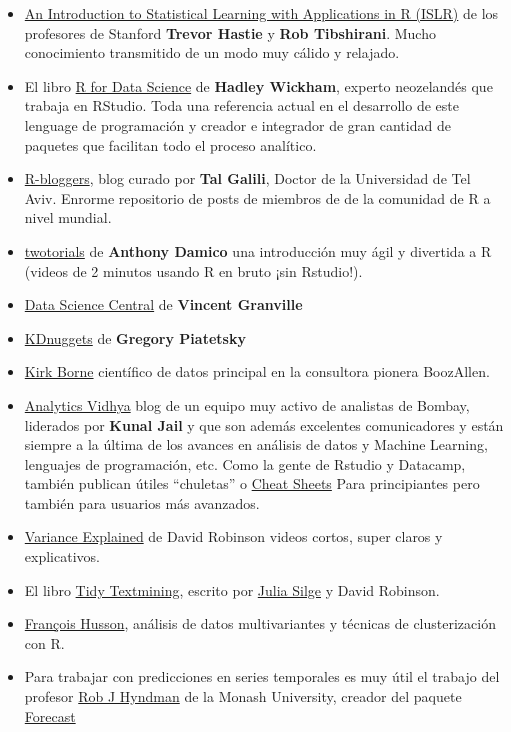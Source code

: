 \documentclass[]{book}
\theoremstyle{definition}
\theoremstyle{definition}
\theoremstyle{remark}
\begin{document}
\begin{itemize}
\item
  \href{http://www-bcf.usc.edu/\%7Egareth/ISL/}{An Introduction to
  Statistical Learning with Applications in R (ISLR)} de los profesores
  de Stanford \textbf{Trevor Hastie} y \textbf{Rob Tibshirani}. Mucho
  conocimiento transmitido de un modo muy cálido y relajado.
\item
  El libro \href{http://r4ds.had.co.nz/}{R for Data Science} de
  \textbf{Hadley Wickham}, experto neozelandés que trabaja en RStudio.
  Toda una referencia actual en el desarrollo de este lenguage de
  programación y creador e integrador de gran cantidad de paquetes que
  facilitan todo el proceso analítico.
\item
  \href{https://www.r-bloggers.com}{R-bloggers}, blog curado por
  \textbf{Tal Galili}, Doctor de la Universidad de Tel Aviv. Enrorme
  repositorio de posts de miembros de de la comunidad de R a nivel
  mundial.
\item
  \href{http://www.twotorials.com/}{twotorials} de \textbf{Anthony
  Damico} una introducción muy ágil y divertida a R (videos de 2 minutos
  usando R en bruto ¡sin Rstudio!).
\item
  \href{http://www.datasciencecentral.com}{Data Science Central} de
  \textbf{Vincent Granville}
\item
  \href{http://www.kdnuggets.com/}{KDnuggets} de \textbf{Gregory
  Piatetsky}
\item
  \href{http://kirkborne.net/}{Kirk Borne} científico de datos principal
  en la consultora pionera BoozAllen.
\item
  \href{https://www.analyticsvidhya.com}{Analytics Vidhya} blog de un
  equipo muy activo de analistas de Bombay, liderados por \textbf{Kunal
  Jail} y que son además excelentes comunicadores y están siempre a la
  última de los avances en análisis de datos y Machine Learning,
  lenguajes de programación, etc. Como la gente de Rstudio y Datacamp,
  también publican útiles ``chuletas'' o
  \href{https://www.analyticsvidhya.com/blog/2017/02/top-28-cheat-sheets-for-machine-learning-data-science-probability-sql-big-data/}{Cheat
  Sheets} Para principiantes pero también para usuarios más avanzados.
\item
  \href{http://varianceexplained.org/RData/}{Variance Explained} de
  David Robinson videos cortos, super claros y explicativos.
\item
  El libro \href{http://tidytextmining.com/intro.html}{Tidy Textmining},
  escrito por \href{https://juliasilge.com/}{Julia Silge} y David
  Robinson.
\item
  \href{http://math.agrocampus-ouest.fr/infoglueDeliverLive/membres/Francois.Husson}{François
  Husson}, análisis de datos multivariantes y técnicas de clusterización
  con R.
\item
  Para trabajar con predicciones en series temporales es muy útil el
  trabajo del profesor \href{https://www.otexts.org/fpp}{Rob J Hyndman}
  de la Monash University, creador del paquete
  \href{http://robjhyndman.com/software/forecast/\%22}{Forecast}
\end{itemize}
\end{document}
